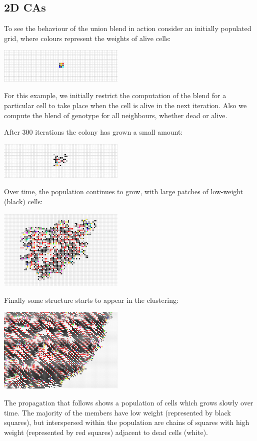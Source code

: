 \documentclass{AISB2008}
\begin{document}
\subsection{2D CAs} \label{2d-results}

To see the behaviour of the union blend in action consider an
initially populated grid, where colours represent the weights of alive
cells:
 \begin{center}
 \includegraphics[width=0.45\textwidth]{initial2d.jpg}
 \end{center}
For this example, we initially restrict the computation of the blend for a particular cell to take place when the cell is alive in the next iteration. Also we compute the blend of genotype for all neighbours, whether dead or alive.

After 300 iterations the colony has grown a small amount:
 \begin{center}
 \includegraphics[width=0.45\textwidth]{3002d.jpg}
 \end{center}
Over time, the population continues to grow, with large patches of low-weight (black) cells:
 \begin{center}
 \includegraphics[width=0.45\textwidth]{30002d.jpg}
 \end{center}
Finally some structure starts to appear in the clustering:
 \begin{center}
 \includegraphics[width=0.45\textwidth]{300002d.jpg}
 \end{center}
The propagation that follows shows a population of cells which grows
slowly over time. The majority of the members have low weight
(represented by black squares), but interspersed within the population
are chains of squares with high weight (represented by red squares)
adjacent to dead cells (white).
\end{document}

